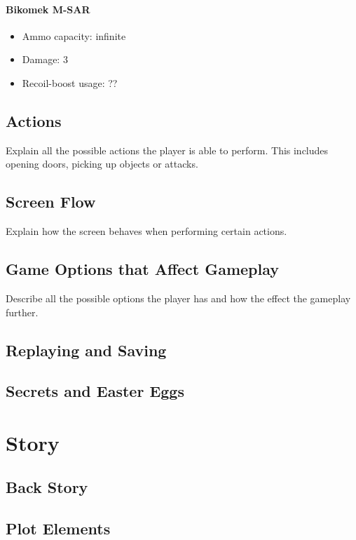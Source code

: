 \documentclass[12pt]{article}
\begin{document}
\paragraph{Bikomek M-SAR} 

\begin{itemize}
	\item Ammo capacity: infinite
	\item Damage: 3
	\item Recoil-boost usage: ??
\end{itemize}

\subsection{Actions}

Explain all the possible actions the player is able to perform. This includes opening doors, picking up objects or attacks.

\subsection{Screen Flow}

Explain how the screen behaves when performing certain actions.

\subsection{Game Options that Affect Gameplay}

Describe all the possible options the player has and how the effect the gameplay further. 

\subsection{Replaying and Saving}

\subsection{Secrets and Easter Eggs}

\section{Story}

\subsection{Back Story}

\subsection{Plot Elements}
\end{document}
